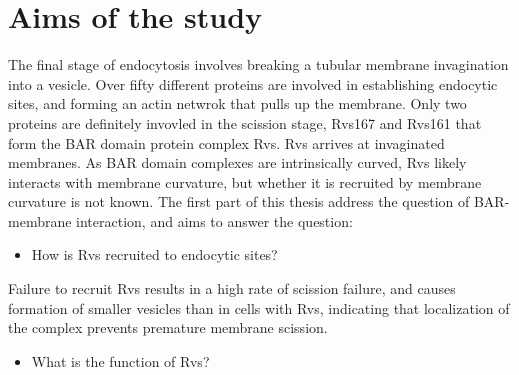
\chapter{Aims of the study} %

\label{Ch:Aims} %

The final stage of endocytosis involves breaking a tubular membrane invagination into a vesicle. Over fifty different proteins are involved in establishing endocytic sites, and forming an actin netwrok that pulls up the membrane. Only two proteins are  definitely invovled in the scission stage, Rvs167 and Rvs161 that form the  BAR domain protein complex Rvs. Rvs arrives at invaginated membranes. As BAR domain complexes are intrinsically curved, Rvs likely interacts with membrane curvature, but whether it is recruited by membrane curvature is not known. The first part of this thesis address the question of BAR-membrane interaction, and aims to answer the question:


\begin{itemize}
	\item How is Rvs recruited to endocytic sites? 
\end{itemize}

Failure to recruit Rvs results in a high rate of scission failure, and causes formation of smaller vesicles than in cells with Rvs, indicating that localization of the complex prevents premature membrane scission.

\begin{itemize}
	\item What is the function of Rvs?
\end{itemize}